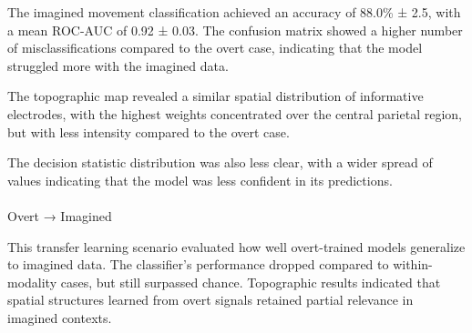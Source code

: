 \documentclass[
  letterpaper,
  DIV=11,
  numbers=noendperiod]{scrartcl}
\makeatletter
\let\oldparagraph\paragraph
\renewcommand{\paragraph}{
    \@ifstar
      \xxxParagraphStar
      \xxxParagraphNoStar
  }
\newcommand{\xxxParagraphStar}[1]{\oldparagraph*{#1}\mbox{}}
\newcommand{\xxxParagraphNoStar}[1]{\oldparagraph{#1}\mbox{}}
\makeatother
\begin{document}
The imagined movement classification achieved an accuracy of 88.0\% ±
2.5, with a mean ROC-AUC of 0.92 ± 0.03. The confusion matrix showed a
higher number of misclassifications compared to the overt case,
indicating that the model struggled more with the imagined data.

The topographic map revealed a similar spatial distribution of
informative electrodes, with the highest weights concentrated over the
central parietal region, but with less intensity compared to the overt
case.

The decision statistic distribution was also less clear, with a wider
spread of values indicating that the model was less confident in its
predictions.

\paragraph{Overt → Imagined}\label{overt-imagined}

This transfer learning scenario evaluated how well overt-trained models
generalize to imagined data. The classifier's performance dropped
compared to within-modality cases, but still surpassed chance.
Topographic results indicated that spatial structures learned from overt
signals retained partial relevance in imagined contexts.
\end{document}
